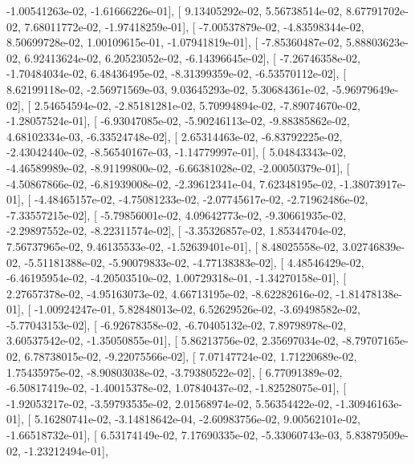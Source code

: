 \documentclass{article}
\begin{document}
         -1.00541263e-02,  -1.61666226e-01],
       [  9.13405292e-02,   5.56738514e-02,   8.67791702e-02,
          7.68011772e-02,  -1.97418259e-01],
       [ -7.00537879e-02,  -4.83598344e-02,   8.50699728e-02,
          1.00109615e-01,  -1.07941819e-01],
       [ -7.85360487e-02,   5.88803623e-02,   6.92413624e-02,
          6.20523052e-02,  -6.14396645e-02],
       [ -7.26746358e-02,  -1.70484034e-02,   6.48436495e-02,
         -8.31399359e-02,  -6.53570112e-02],
       [  8.62199118e-02,  -2.56971569e-03,   9.03645293e-02,
          5.30684361e-02,  -5.96979649e-02],
       [  2.54654594e-02,  -2.85181281e-02,   5.70994894e-02,
         -7.89074670e-02,  -1.28057524e-01],
       [ -6.93047085e-02,  -5.90246113e-02,  -9.88385862e-02,
          4.68102334e-03,  -6.33524748e-02],
       [  2.65314463e-02,  -6.83792225e-02,  -2.43042440e-02,
         -8.56540167e-03,  -1.14779997e-01],
       [  5.04843343e-02,  -4.46589989e-02,  -8.91199800e-02,
         -6.66381028e-02,  -2.00050379e-01],
       [ -4.50867866e-02,  -6.81939008e-02,  -2.39612341e-04,
          7.62348195e-02,  -1.38073917e-01],
       [ -4.48465157e-02,  -4.75081233e-02,  -2.07745617e-02,
         -2.71962486e-02,  -7.33557215e-02],
       [ -5.79856001e-02,   4.09642773e-02,  -9.30661935e-02,
         -2.29897552e-02,  -8.22311574e-02],
       [ -3.35326857e-02,   1.85344704e-02,   7.56737965e-02,
          9.46135533e-02,  -1.52639401e-01],
       [  8.48025558e-02,   3.02746839e-02,  -5.51181388e-02,
         -5.90079833e-02,  -4.77138383e-02],
       [  4.48546429e-02,  -6.46195954e-02,  -4.20503510e-02,
          1.00729318e-01,  -1.34270158e-01],
       [  2.27657378e-02,  -4.95163073e-02,   4.66713195e-02,
         -8.62282616e-02,  -1.81478138e-01],
       [ -1.00924247e-01,   5.82848013e-02,   6.52629526e-02,
         -3.69498582e-02,  -5.77043153e-02],
       [ -6.92678358e-02,  -6.70405132e-02,   7.89798978e-02,
          3.60537542e-02,  -1.35050855e-01],
       [  5.86213756e-02,   2.35697034e-02,  -8.79707165e-02,
          6.78738015e-02,  -9.22075566e-02],
       [  7.07147724e-02,   1.71220689e-02,   1.75435975e-02,
         -8.90803038e-02,  -3.79380522e-02],
       [  6.77091389e-02,  -6.50817419e-02,  -1.40015378e-02,
          1.07840437e-02,  -1.82528075e-01],
       [ -1.92053217e-02,  -3.59793535e-02,   2.01568974e-02,
          5.56354422e-02,  -1.30946163e-01],
       [  5.16280741e-02,  -3.14818642e-04,  -2.60983756e-02,
          9.00562101e-02,  -1.66518732e-01],
       [  6.53174149e-02,   7.17690335e-02,  -5.33060743e-03,
          5.83879509e-02,  -1.23212494e-01],
\end{document}

